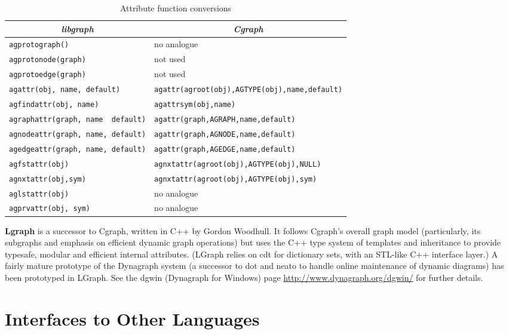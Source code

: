 \documentclass[11pt,letterpaper]{article}
\begin{document}
\begin{savenotes}
\begin{table*}[ht]
\centering
\begin{tabular}{|l|l|} \hline
\multicolumn{1}{|c|}{\em libgraph} & \multicolumn{1}{c|}{\em Cgraph} \\ \hline
\verb"agprotograph()"      &  no analogue \\ \hline
\verb"agprotonode(graph)"  &  not used \\ \hline
\verb"agprotoedge(graph)"  &  not used \\ \hline
\verb"agattr(obj, name, default)" & \verb"agattr(agroot(obj),AGTYPE(obj),name,default)" \\ \hline
\verb"agfindattr(obj, name)"& \verb"agattrsym(obj,name)" \\ \hline
\verb"agraphattr(graph, name  default)" & \verb"agattr(graph,AGRAPH,name,default)"\\ \hline
\verb"agnodeattr(graph, name, default)" & \verb"agattr(graph,AGNODE,name,default)"\\ \hline
\verb"agedgeattr(graph, name, default)" & \verb"agattr(graph,AGEDGE,name,default)"\\ \hline
\verb"agfstattr(obj)"   & \verb"agnxtattr(agroot(obj),AGTYPE(obj),NULL)"\\ \hline
\verb"agnxtattr(obj,sym)"   & \verb"agnxtattr(agroot(obj),AGTYPE(obj),sym)"\\ \hline
\verb"aglstattr(obj)" & no analogue\\ \hline
\verb"agprvattr(obj, sym)" & no analogue\\ \hline
\end{tabular}
\caption{Attribute function conversions}
\label{table:libgraph:a}
\end{table*}


{\bf Lgraph} is a successor to Cgraph, written in C++ by Gordon Woodhull.
It follows Cgraph's overall graph model (particularly, its subgraphs and
emphasis on efficient dynamic graph operations) but uses the C++ type
system of templates and inheritance to provide typesafe, modular and
efficient internal attributes.  (LGraph relies on cdt for dictionary
sets, with an STL-like C++ interface layer.)  A fairly mature prototype
of the Dynagraph system (a successor to dot and neato to handle
online maintenance of dynamic diagrams) has been prototyped in LGraph.
See the dgwin (Dynagraph for Windows) page 
\url{http://www.dynagraph.org/dgwin/} for further details. 

\section{Interfaces to Other Languages}
\label{sec:interfacetootherlanguages}


\end{savenotes}
\end{document}
